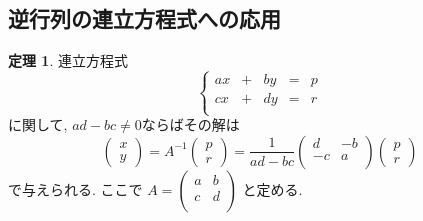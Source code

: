 \documentclass[dvipdfmx,a4paper,11pt]{article}
\theoremstyle{definition}
\newtheorem{thm}{定理}
\begin{document}
\subsection{逆行列の連立方程式への応用}



\begin{tcolorbox}[
    colback = white,
    colframe = green!35!black,
    fonttitle = \bfseries,
    breakable = true]
    \begin{thm}
連立方程式
$$
 \left\{ 
\begin{matrix}
ax&+&by&= &p \\
cx&+&dy&= &r \\
\end{matrix}
\right.
$$
に関して, $ad-bc \neq 0$ならばその解は
$$
 \begin{pmatrix}
 x \\
 y
 \end{pmatrix} 
 = A^{-1}
  \begin{pmatrix}
 p \\
 r
 \end{pmatrix} 
 =
  \frac{1}{ad-bc}
 \begin{pmatrix}
 d& -b  \\
 -c& a  \\
 \end{pmatrix} 
   \begin{pmatrix}
 p \\
 r
 \end{pmatrix} 
$$
で与えられる. 
ここで
 $A=
  \begin{pmatrix}
 a& b  \\
 c& d  \\
 \end{pmatrix} 
 $
 と定める.
    \end{thm}
 \end{tcolorbox}
 
\end{document}
